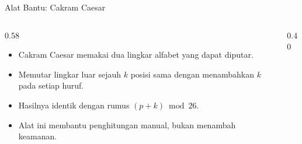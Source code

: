 \documentclass[aspectratio=169,11pt]{beamer}
\begin{document}
\begin{frame}{Alat Bantu: Cakram Caesar}
    \begin{columns}[T,onlytextwidth]
        \begin{column}{0.58\textwidth}
            \begin{itemize}
                \item Cakram Caesar memakai dua lingkar alfabet yang dapat
                      diputar.
                \item Memutar lingkar luar sejauh $k$ posisi sama dengan
                      menambahkan $k$ pada setiap huruf.
                \item Hasilnya identik dengan rumus $(p+k)\bmod 26$.
                \item Alat ini membantu penghitungan manual, bukan menambah
                      keamanan.
            \end{itemize}
        \end{column}
        \begin{column}{0.40\textwidth}
            \centering
        \end{column}
    \end{columns}
\end{frame}
\end{document}
